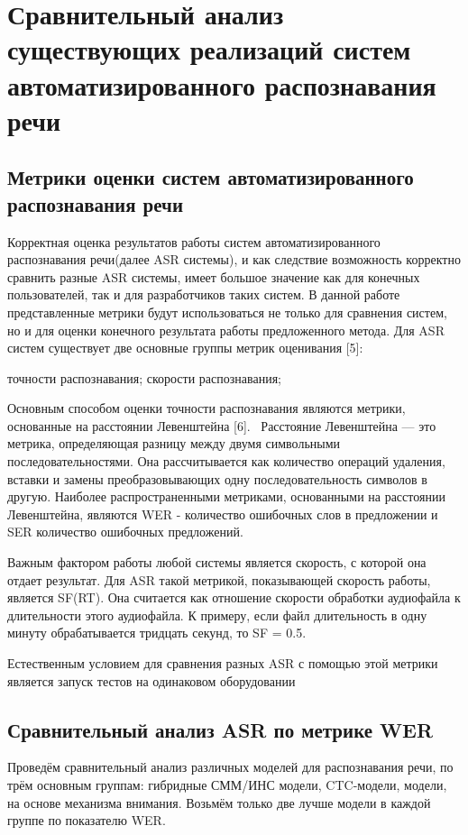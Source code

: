\documentclass[conference]{IEEEtran}
\begin{document}
    \section{Сравнительный анализ существующих реализаций систем автоматизированного распознавания речи}

    \subsection{Метрики оценки систем автоматизированного распознавания речи}\label{AA}

    Корректная оценка результатов работы систем автоматизированного распознавания речи(далее ASR системы), и как следствие возможность корректно сравнить разные ASR системы, имеет большое значение как для конечных пользователей, так и для разработчиков таких систем. В данной работе представленные метрики будут использоваться не только для сравнения систем, но и для оценки конечного результата работы предложенного метода.
    Для ASR систем существует две основные группы метрик оценивания [5]:
    \begin{itemize}
         точности распознавания;
         скорости распознавания;
    \end{itemize}

    Основным способом оценки точности распознавания являются метрики, основанные на расстоянии Левенштейна [6]. 
Расстояние Левенштейна — это метрика, определяющая разницу между двумя символьными последовательностями. Она рассчитывается как количество операций удаления, вставки и замены преобразовывающих одну последовательность символов в другую. Наиболее распространенными метриками, основанными на расстоянии Левенштейна, являются WER - количество ошибочных слов в предложении и SER количество ошибочных предложений.

Важным фактором работы любой системы является скорость, с которой она отдает результат. Для ASR такой метрикой, показывающей скорость работы, является SF(RT). Она считается как отношение скорости обработки аудиофайла к длительности этого аудиофайла. К примеру, если файл длительность в одну минуту обрабатывается тридцать секунд, то SF = 0.5.

Естественным условием для сравнения разных ASR с помощью этой метрики является запуск тестов на одинаковом оборудовании

\subsection{Сравнительный анализ ASR по метрике WER}\label{AA}
Проведём сравнительный анализ различных моделей для распознавания речи, по трём основным группам: гибридные СММ/ИНС модели, CTC-модели, модели, на основе механизма внимания. Возьмём только две лучше модели в каждой группе по показателю WER.
\end{document}
